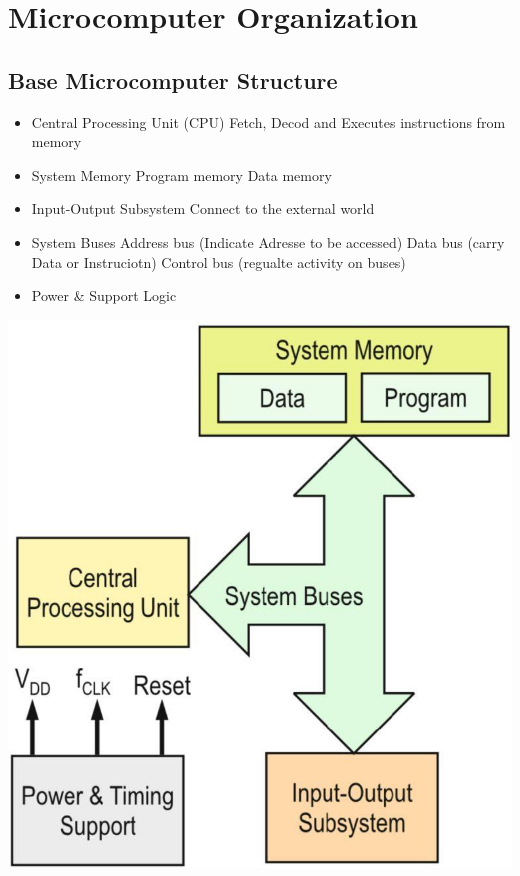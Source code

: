 \section{Microcomputer Organization}
\subsection{Base Microcomputer Structure}
\begin{minipage}{0.7\linewidth}
	\begin{itemize}
		\item Central Processing Unit (CPU)
		\subitem Fetch, Decod and Executes instructions from memory
		\item System Memory
		\subitem Program memory
		\subitem Data memory 
		\item Input-Output Subsystem
		\subitem Connect to the external world
		\item System Buses 
		\subitem Address bus (Indicate Adresse to be accessed)
		\subitem Data bus (carry Data or Instruciotn)
		\subitem Control bus (regualte activity on buses)
		\item Power \& Support Logic
	\end{itemize}
\end{minipage}
\begin{minipage}{0.3\linewidth}
	\includegraphics[width=0.8\linewidth]{images/uCArchitecture} 
\end{minipage}
